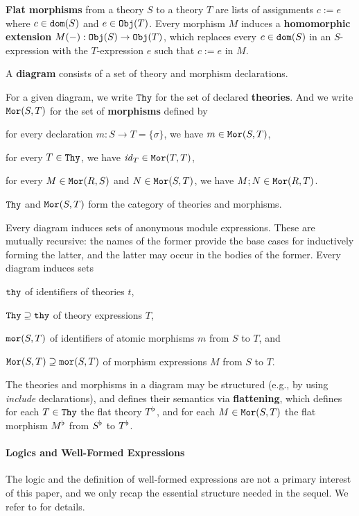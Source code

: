 \textbf{Flat morphisms} from a theory $S$ to a theory $T$ are lists of assignments $c:=e$ where $c\in\mathtt{dom}(S)$ and $e\in\mathtt{Obj}(T)$.
Every morphism $M$ induces a \textbf{homomorphic extension} $M(-):\mathtt{Obj}(S)\to\mathtt{Obj}(T)$, which replaces every $c\in\mathtt{dom}(S)$ in an $S$-expression with the $T$-expression $e$ such that $c:=e$ in $M$.

A \textbf{diagram} consists of a set of theory and morphism declarations.
\begin{nomodexp}
For a given diagram, we write $\mathtt{Thy}$ for the set of declared \textbf{theories}.
And we write $\mathtt{Mor}(S,T)$ for the set of \textbf{morphisms} defined by
\begin{compactitem}
 \item for every declaration $m:S\to T=\{\sigma\}$, we have $m\in\mathtt{Mor}(S,T)$,
 \item for every $T\in\mathtt{Thy}$, we have $\mathit{id}_{T}\in\mathtt{Mor}(T,T)$,
 \item for every $M\in\mathtt{Mor}(R,S)$ and $N\in\mathtt{Mor}(S,T)$, we have $M;N\in\mathtt{Mor}(R,T)$.
\end{compactitem}
$\mathtt{Thy}$ and $\mathtt{Mor}(S,T)$ form the category of theories and morphisms.
\end{nomodexp}
\begin{modexp}
Every diagram induces sets of anonymous module expressions.
These are mutually recursive: the names of the former provide the base cases for inductively forming the latter, and the latter may occur in the bodies of the former.
Every diagram induces sets
\begin{compactitem}
 \item $\mathtt{thy}$ of identifiers of theories $t$,
 \item $\mathtt{Thy}\supseteq \mathtt{thy}$ of theory expressions $T$,
 \item $\mathtt{mor}(S,T)$ of identifiers of atomic morphisms $m$ from $S$ to $T$, and
 \item $\mathtt{Mor}(S,T)\supseteq\mathtt{mor}(S,T)$ of morphism expressions $M$ from $S$ to $T$.
\end{compactitem}
\end{modexp}

The theories and morphisms in a diagram may be structured (e.g., by using \emph{include} declarations), and \mmt defines their semantics via \textbf{flattening}, which defines for each $T\in\mathtt{Thy}$ the flat theory $T^\flat$, and for each $M\in\mathtt{Mor}(S,T)$ the flat morphism $M^\flat$ from $S^\flat$ to $T^\flat$.

\paragraph{Logics and Well-Formed Expressions}
The logic and the definition of well-formed expressions are not a primary interest of this paper, and we only recap the essential structure needed in the sequel.
We refer to \cite{rabe:howto:14} for details.

